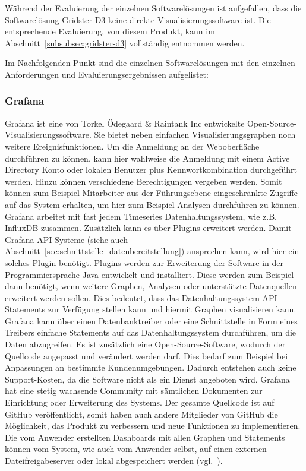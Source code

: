 Während der Evaluierung der einzelnen Softwarelösungen ist aufgefallen, dass
die Softwarelösung Gridster-D3 keine direkte Visualisierungssoftware
ist. Die entsprechende Evaluierung, von diesem Produkt, kann im
Abschnitt~\ref{subsubsec:gridster-d3} vollständig entnommen werden.

Im Nachfolgenden Punkt sind die einzelnen Softwarelösungen mit den einzelnen
Anforderungen und Evaluierungsergebnissen aufgelistet:
\mr%

\subsubsection{Grafana}
\label{subsubsec:grafana}
Grafana ist eine von Torkel Ödegaard \& Raintank Inc entwickelte
Open-Source-Visualisierungssoftware. Sie bietet neben einfachen
Visualisierungsgraphen noch weitere Ereignisfunktionen. Um die Anmeldung an der
Weboberfläche durchführen zu können, kann hier wahlweise die Anmeldung mit
einem \gls{Active Directory} Konto oder lokalen Benutzer plus
Kennwortkombination durchgeführt werden. Hinzu können verschiedene
Berechtigungen vergeben werden. Somit können zum Beispiel Mitarbeiter aus der
Führungsebene eingeschränkte Zugriffe auf das System erhalten, um hier zum
Beispiel Analysen durchführen zu können. Grafana arbeitet mit fast jedem
Timeseries Datenhaltungssystem, wie z.B. InfluxDB zusammen. Zusätzlich kann es
über Plugins erweitert werden. Damit Grafana API Systeme (siehe auch
Abschnitt~\ref{sec:schnittstelle_datenbereitstellung}) ansprechen kann, wird
hier ein solches Plugin benötigt. Plugins werden zur Erweiterung der Software
in der Programmiersprache Java entwickelt und installiert. Diese werden zum
Beispiel dann benötigt, wenn weitere Graphen, Analysen oder unterstützte
Datenquellen erweitert werden sollen. Dies bedeutet, dass das
Datenhaltungssystem API Statements zur Verfügung stellen kann und hiermit
Graphen visualisieren kann. Grafana kann über einen \gls{Datenbanktreiber} oder
eine Schnittstelle in Form eines Treibers einfache Statements auf das
Datenhaltungssystem durchführen, um die Daten abzugreifen. Es ist zusätzlich
eine Open-Source-Software, wodurch der Quellcode angepasst und verändert werden
darf. Dies bedarf zum Beispiel bei Anpassungen an bestimmte Kundenumgebungen.
Dadurch entstehen auch keine Support-Kosten, da die Software nicht als ein
Dienst angeboten wird. Grafana hat eine stetig wachsende Community mit
sämtlichen Dokumenten zur Einrichtung oder Erweiterung des Systems. Der gesamte
Quellcode ist auf GitHub veröffentlicht, somit haben auch andere Mitglieder von
GitHub die Möglichkeit, das Produkt zu verbessern und neue Funktionen zu
implementieren. Die vom Anwender erstellten Dashboards mit allen Graphen und
Statements können vom System, wie auch vom Anwender selbst, auf einen externen
Dateifreigabeserver oder lokal abgespeichert werden (vgl.~\cite{grafana}).

